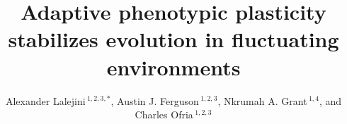 \documentclass[utf8]{frontiersSCNS} %
\def\firstAuthorLast{Lalejini {et~al.}} %
\def\Authors{Alexander Lalejini\,$^{1,2,3,*}$, Austin J. Ferguson\,$^{1,2,3}$, Nkrumah A. Grant\,$^{1,4}$, and Charles Ofria\,$^{1,2,3}$}
\providecommand{\DIFdelbegin}{} %
\providecommand{\DIFdelend}{} %
\newcommand{\DIFscaledelfig}{0.5}
\newlength{\DIFdelgraphicswidth} %
\newlength{\DIFdelgraphicsheight} %
\newcommand{\DIFdelincludegraphics}[2][]{%
\sbox{\DIFdelgraphicsbox}{\DIFOincludegraphics[#1]{#2}}%
\settoboxwidth{\DIFdelgraphicswidth}{\DIFdelgraphicsbox} %
\settoboxtotalheight{\DIFdelgraphicsheight}{\DIFdelgraphicsbox} %
\scalebox{\DIFscaledelfig}{%
\parbox[b]{\DIFdelgraphicswidth}{\usebox{\DIFdelgraphicsbox}\\[-\baselineskip] \rule{\DIFdelgraphicswidth}{0em}}\llap{\resizebox{\DIFdelgraphicswidth}{\DIFdelgraphicsheight}{%
\setlength{\unitlength}{\DIFdelgraphicswidth}%
\begin{picture}(1,1)%
\thicklines\linethickness{2pt} %
{\color[rgb]{1,0,0}\put(0,0){\framebox(1,1){}}}%
{\color[rgb]{1,0,0}\put(0,0){\line( 1,1){1}}}%
{\color[rgb]{1,0,0}\put(0,1){\line(1,-1){1}}}%
\end{picture}%
}\hspace*{3pt}}} %
} %
\DeclareRobustCommand{\DIFdelbegin}{\DIFOdelbegin \let\includegraphics\DIFdelincludegraphics} %
\DeclareRobustCommand{\DIFdelend}{\DIFOaddend \let\includegraphics\DIFOincludegraphics} %
\begin{document}
\onecolumn
{}

\title[Adaptive plasticity stabilizes evolution]{Adaptive phenotypic plasticity stabilizes evolution in fluctuating environments}

\author[\firstAuthorLast ]{\Authors} %
\address{} %
\correspondance{} %

\extraAuth{}%


\maketitle


\newcommand{\code}{\texttt}

\DIFdelbegin %

\DIFdelend %
\newcommand{\evolutionaryChangeRateReplicates}{100}
\DIFdelbegin %

\DIFdelend \newcommand{\evolutionaryChangeRatePlasticReps}{42}

\newcommand{\novelTraitsReplicates}{100}
\newcommand{\novelTraitsReward}{10\%}
\newcommand{\novelTraitsPlasticReps}{42}
\end{document}
